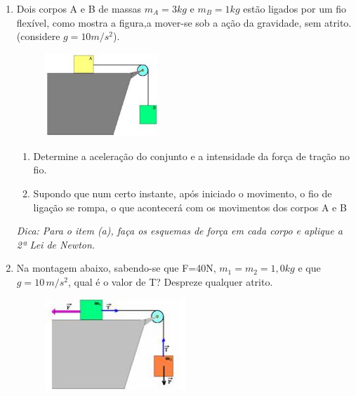 \documentclass[12pt,letterpaper,fleqn]{article}
\begin{document}
\begin{itemize}
\begin{enumerate}
        \item Dois corpos A e B de massas $m_A=3kg$ e $m_B=1kg$ estão ligados por um fio flexível, como mostra a figura,a mover-se sob a ação da gravidade, sem atrito. (considere $g=10m/s^2$).
        \begin{figure}[h]
            \centering
            \includegraphics[width=0.4\textwidth]{ex_9.jpg}
        \end{figure}
        \begin{enumerate}
            \item Determine a aceleração do conjunto e a intensidade da força de tração no fio.
            \item Supondo que num certo instante, após iniciado o movimento, o fio de ligação se rompa, o que acontecerá com os movimentos dos corpos A e B
        \end{enumerate}
        
        \textit{Dica: Para o item (a), faça os esquemas de força em cada corpo e aplique a 2ª Lei de Newton.}
        
        \item Na montagem abaixo, sabendo-se que F=40N, $m_1=m_2=1,0kg$ e que $g=10\,m/s^2$, qual é o valor de T? Despreze qualquer atrito.
        \begin{figure}[h]
            \centering
            \includegraphics[width=0.5\textwidth]{ex_10.jpg}
        \end{figure}
        

\end{enumerate}
\end{itemize}
\end{document}
